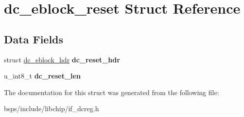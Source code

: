 \hypertarget{structdc__eblock__reset}{}\section{dc\+\_\+eblock\+\_\+reset Struct Reference}
\label{structdc__eblock__reset}
\subsection*{Data Fields}
\begin{DoxyCompactItemize}
\item 
\mbox{\label{structdc__eblock__reset_afce94a038c7aa74d295a36e8ec1f4fb4}} 
struct \mbox{\hyperlink{structdc__eblock__hdr}{dc\+\_\+eblock\+\_\+hdr}} {\bfseries dc\+\_\+reset\+\_\+hdr}
\item 
\mbox{\label{structdc__eblock__reset_aa22ba15e26d5fbc2eb2ae45dad7cb8ed}} 
u\+\_\+int8\+\_\+t {\bfseries dc\+\_\+reset\+\_\+len}
\end{DoxyCompactItemize}


The documentation for this struct was generated from the following file\+:\begin{DoxyCompactItemize}
\item 
bsps/include/libchip/if\+\_\+dcreg.\+h\end{DoxyCompactItemize}
